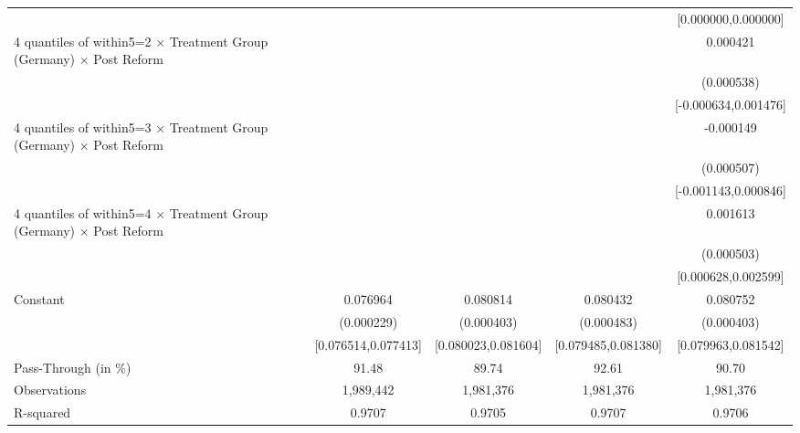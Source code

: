 {\begin{tabular}{l*{4}{c}}
                    &                     &                     &                     &[0.000000,0.000000]         \\
4 quantiles of within5=2 $\times$ Treatment Group (Germany) $\times$ Post Reform&                     &                     &                     &    0.000421         \\
                    &                     &                     &                     &  (0.000538)         \\
                    &                     &                     &                     &[-0.000634,0.001476]         \\
4 quantiles of within5=3 $\times$ Treatment Group (Germany) $\times$ Post Reform&                     &                     &                     &   -0.000149         \\
                    &                     &                     &                     &  (0.000507)         \\
                    &                     &                     &                     &[-0.001143,0.000846]         \\
4 quantiles of within5=4 $\times$ Treatment Group (Germany) $\times$ Post Reform&                     &                     &                     &    0.001613\sym{***}\\
                    &                     &                     &                     &  (0.000503)         \\
                    &                     &                     &                     &[0.000628,0.002599]         \\
Constant            &    0.076964\sym{***}&    0.080814\sym{***}&    0.080432\sym{***}&    0.080752\sym{***}\\
                    &  (0.000229)         &  (0.000403)         &  (0.000483)         &  (0.000403)         \\
                    &[0.076514,0.077413]         &[0.080023,0.081604]         &[0.079485,0.081380]         &[0.079963,0.081542]         \\
\midrule
Pass-Through (in \%)&       91.48         &       89.74         &       92.61         &       90.70         \\
Observations        &   1,989,442         &   1,981,376         &   1,981,376         &   1,981,376         \\
R-squared           &      0.9707         &      0.9705         &      0.9707         &      0.9706         \\
\bottomrule
\end{tabular}
}

